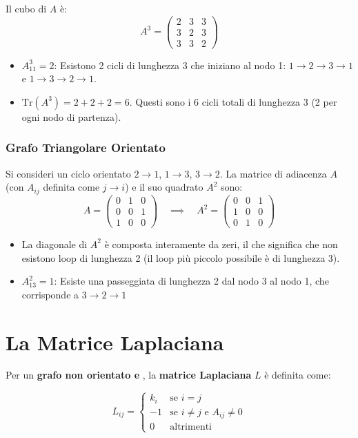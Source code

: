 	Il cubo di $A$ è:
	$$A^3 = \begin{pmatrix} 2 & 3 & 3 \\ 3 & 2 & 3 \\ 3 & 3 & 2 \end{pmatrix}$$
	
	\begin{itemize}
		\item $A^3_{11} = 2$: Esistono 2 cicli di lunghezza 3 che iniziano al nodo 1: $1 \to 2 \to 3 \to 1$ e $1 \to 3 \to 2 \to 1$.
		\item $\text{Tr}(A^3) = 2+2+2 = 6$. Questi sono i 6 cicli totali di lunghezza 3 (2 per ogni nodo di partenza).
	\end{itemize}
	
	\subsubsection{Grafo Triangolare Orientato}
	Si consideri un ciclo orientato $2 \to 1$, $1 \to 3$, $3 \to 2$.
	La matrice di adiacenza $A$ (con $A_{ij}$ definita come $j \to i$) e il suo quadrato $A^2$ sono:
	$$A = \begin{pmatrix} 0 & 1 & 0 \\ 0 & 0 & 1 \\ 1 & 0 & 0 \end{pmatrix} \quad \implies \quad A^2 = \begin{pmatrix} 0 & 0 & 1 \\ 1 & 0 & 0 \\ 0 & 1 & 0 \end{pmatrix}$$
	
	\begin{itemize}
		\item La diagonale di $A^2$ è composta interamente da zeri, il che significa che non esistono loop di lunghezza 2 (il loop più piccolo possibile è di lunghezza 3).
		\item $A^2_{13} = 1$: Esiste una passeggiata di lunghezza 2 dal nodo 3 al nodo 1, che corrisponde a $3 \to 2 \to 1$
	\end{itemize}
	
	
	\section{La Matrice Laplaciana}
	Per un \textbf{grafo non orientato e \color{colorF}{non pesato}}, la \textbf{matrice Laplaciana} $L$ è definita come:
    \begin{tcolorbox}[colback=yellow!25, colframe=yellow!75!orange, coltitle=black, title=\textbf{Matrice Laplaciana}]
\begin{equation}
L_{ij} = \begin{cases}
		k_i & \text{se } i = j \\
		-1  & \text{se } i \neq j \text{ e } A_{ij} \neq 0 \\
		0   & \text{altrimenti}
	\end{cases}
\end{equation}
\end{tcolorbox}

